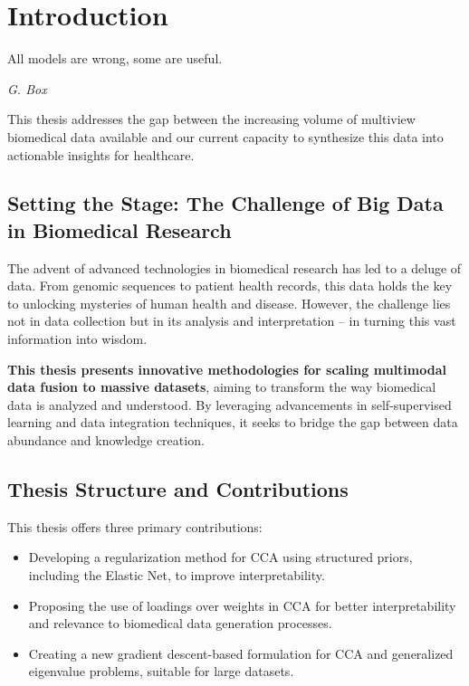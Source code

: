 \graphicspath{{chapters/introduction/}}
\chapter{Introduction}\label{chap:introduction}

\epigraph{All models are wrong, some are useful.}{\textit{G. Box}}

This thesis addresses the gap between the increasing volume of multiview biomedical data available and our current capacity to synthesize this data into actionable insights for healthcare.

\section{Setting the Stage: The Challenge of Big Data in Biomedical Research}

The advent of advanced technologies in biomedical research has led to a deluge of data.
From genomic sequences to patient health records, this data holds the key to unlocking mysteries of human health and disease.
However, the challenge lies not in data collection but in its analysis and interpretation – in turning this vast information into wisdom.

\textbf{This thesis presents innovative methodologies for scaling multimodal data fusion to massive datasets}, aiming to transform the way biomedical data is analyzed and understood.
By leveraging advancements in self-supervised learning and data integration techniques, it seeks to bridge the gap between data abundance and knowledge creation.

\section{Thesis Structure and Contributions}

This thesis offers three primary contributions:

\begin{itemize}
    \item Developing a regularization method for CCA using structured priors, including the Elastic Net, to improve interpretability.
    \item Proposing the use of loadings over weights in CCA for better interpretability and relevance to biomedical data generation processes.
    \item Creating a new gradient descent-based formulation for CCA and generalized eigenvalue problems, suitable for large datasets.
\end{itemize}

